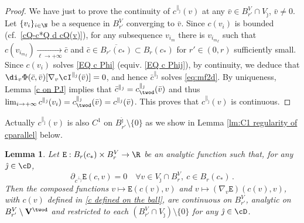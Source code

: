 \documentclass[11pt,a4paper,reqno]{article}
\numberwithin{equation}{section}
\newtheorem{lemma}[theorem]{Lemma}
\theoremstyle{definition}
\begin{document}
\begin{proof}
We have just to prove the continuity
of $ c^{\parallel_{\hat \jmath}}(v) $ 
at any  $ \bar v \in B_{r'}^V\cap V_{\hat \jmath}  $, $ \bar v \neq 0 $.
    Let $\{v_i\}_{i\in \N}$ be a sequence in $B_{r'}^V $ converging  to $\bar v  $.
    Since $c(v_i) $ is bounded (cf.~\eqref{cQ-c*Q d cQ(v)}), for any subsequence $ v_{i_m} $ there is $ v_{{i_m}_\ell} $ such that 
    $ c(v_{{i_m}_\ell}) \xrightarrow[\ell\to+\infty]{}\bar c $ and $\bar c\in \overline{B_{r'}(c_*)}\subset B_r(c_*)$ for $r'\in (0,r)$ sufficiently small. 
    Since $c(v_i )$ solves \eqref{EQ c Phi} (equiv. \eqref{EQ c Phij}), by continuity, we deduce that
    $
        \di_v\Phi(\bar c,\bar v)[\nabla_v \cI^{\parallel_{\hat \jmath}}(\bar v)]=0 $,  
    and hence $\bar c^{\parallel_{\hat \jmath}}$ solves
        \eqref{eq:mf2d}. 
    By uniqueness,
    Lemma \ref{c on PJ} implies that $\bar c^{\parallel_{\hat \jmath}}=c^{\parallel_{\hat \jmath}}_{\twod}(\bar v)$ and thus $\lim_{i\to +\infty}c^{\parallel_{\hat \jmath}}(v_i)=c^{\parallel_{\hat \jmath}}_{\twod}(\bar v)=c^{\parallel_{\hat \jmath}}(\bar v)$. This proves that $c^{\parallel_{\hat \jmath}}(v)  $  is continuous.
\end{proof}

Actually $ c^{\parallel_{\hat \jmath}} (v)$ is also $ C^1 $ 
on $B_{r'}^{\hat \jmath}\setminus\{0\}$ as we show in Lemma \ref{lm:C1 regularity of cparallel} below. 



\begin{lemma}\label{lm:regularity}
    Let $ {\mathtt E} :B_{r}(c_*)\times B_{r}^V\to \R$ be an analytic 
    function such that, for any
   $ {\hat \jmath} \in \cD $, 
        \begin{equation}\label{laderab}
    \partial_{c^{\bot_{\hat \jmath}}}{\mathtt E} (c,v)=0 \quad \forall   v\in  V_{\hat \jmath} \cap B_{r}^V , \   c\in B_{r}(c_*)    \, .
        \end{equation}
        Then the composed functions 
        $
            v\mapsto {\mathtt E} (c(v),v)$ and $v\mapsto (\nabla_v {\mathtt E}) (c(v),v)
        $, with $ c(v) $ defined in 
        \eqref{c defined on the ball},  
        are continuous on $B_{r'}^V$, analytic on $B_{r'}^V\setminus {\bf V}^{\twod}$ and 
        restricted to each $(B_{r'}^V\cap V_{\hat \jmath})\setminus\{0\}$ for any ${\hat \jmath} \in \cD $.
\end{lemma}
\end{document}
